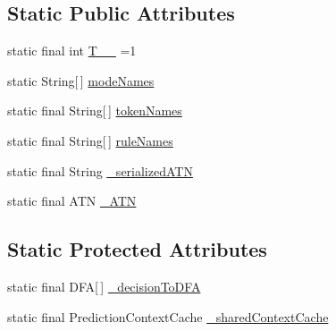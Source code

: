 \subsection*{Static Public Attributes}
\begin{DoxyCompactItemize}
\item 
static final int \hyperlink{classit_1_1emarolab_1_1cagg_1_1core_1_1language_1_1parser_1_1ANTLRInterface_1_1ANTLRGenerated_1_1CAGGSyntaxDefinitionLexer_a4892386f205f7148111cf48984eff20a}{T\-\_\-\-\_} =1
\item 
static String\mbox{[}$\,$\mbox{]} \hyperlink{classit_1_1emarolab_1_1cagg_1_1core_1_1language_1_1parser_1_1ANTLRInterface_1_1ANTLRGenerated_1_1CAGGSyntaxDefinitionLexer_a35146af8f94f18805a9c69161fbf40ef}{mode\-Names}
\item 
static final String\mbox{[}$\,$\mbox{]} \hyperlink{classit_1_1emarolab_1_1cagg_1_1core_1_1language_1_1parser_1_1ANTLRInterface_1_1ANTLRGenerated_1_1CAGGSyntaxDefinitionLexer_a0300add2a3d235514bd9cd88e940f9ec}{token\-Names}
\item 
static final String\mbox{[}$\,$\mbox{]} \hyperlink{classit_1_1emarolab_1_1cagg_1_1core_1_1language_1_1parser_1_1ANTLRInterface_1_1ANTLRGenerated_1_1CAGGSyntaxDefinitionLexer_a31c73f851b28d09e30f7f5417c9099cf}{rule\-Names}
\item 
static final String \hyperlink{classit_1_1emarolab_1_1cagg_1_1core_1_1language_1_1parser_1_1ANTLRInterface_1_1ANTLRGenerated_1_1CAGGSyntaxDefinitionLexer_a636c9defe2f51d73d7a76aee4c8386b1}{\-\_\-serialized\-A\-T\-N}
\item 
static final A\-T\-N \hyperlink{classit_1_1emarolab_1_1cagg_1_1core_1_1language_1_1parser_1_1ANTLRInterface_1_1ANTLRGenerated_1_1CAGGSyntaxDefinitionLexer_acc1592a5dbc333e84f20363acfeb2e9c}{\-\_\-\-A\-T\-N}
\end{DoxyCompactItemize}
\subsection*{Static Protected Attributes}
\begin{DoxyCompactItemize}
\item 
static final D\-F\-A\mbox{[}$\,$\mbox{]} \hyperlink{classit_1_1emarolab_1_1cagg_1_1core_1_1language_1_1parser_1_1ANTLRInterface_1_1ANTLRGenerated_1_1CAGGSyntaxDefinitionLexer_ae6d5f9d4a7049c196f4d41b51b8d7be3}{\-\_\-decision\-To\-D\-F\-A}
\item 
static final Prediction\-Context\-Cache \hyperlink{classit_1_1emarolab_1_1cagg_1_1core_1_1language_1_1parser_1_1ANTLRInterface_1_1ANTLRGenerated_1_1CAGGSyntaxDefinitionLexer_a8683d7e755bab0980e5a5c570f71105a}{\-\_\-shared\-Context\-Cache}
\end{DoxyCompactItemize}
